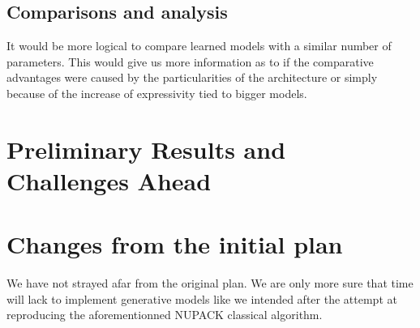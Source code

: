 \documentclass{article}
\begin{document}
\subsection{Comparisons and analysis}
It would be more logical to compare learned models with a similar 
number of parameters. This would give us more information as 
to if the comparative advantages were caused by the particularities 
of the architecture or simply because of the increase of expressivity 
tied to bigger models.

\section{Preliminary Results and Challenges Ahead}

\section{Changes from the initial plan}
We have not strayed afar from the original plan. We 
are only more sure that time will lack to implement 
generative models like we intended after the attempt at reproducing
the aforementionned NUPACK classical algorithm.



\end{document}
